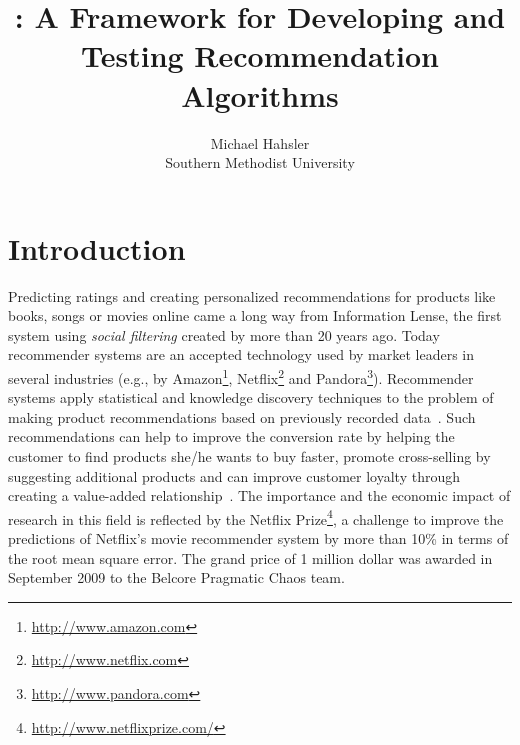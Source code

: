 \documentclass[nojss]{jss}
\author{Michael Hahsler\\Southern Methodist University}
\title{\pkg{recommenderlab}: A Framework for Developing and Testing Recommendation Algorithms}
\begin{document}




\section{Introduction}
Predicting ratings and creating personalized recommendations for products like
books, songs or movies online came a long way from 
Information Lense,
the first system using
\emph{social filtering} created by \cite{recommender:Malone:1987} more than 20
years ago.  Today recommender systems are an accepted technology used by market
leaders in several industries (e.g., by 
Amazon\footnote{\url{http://www.amazon.com}}, 
Netflix\footnote{\url{http://www.netflix.com}} and 
Pandora\footnote{\url{http://www.pandora.com}}).  
Recommender
systems apply statistical and knowledge discovery techniques to the problem of
making product recommendations based on previously recorded 
data~\citep{recommender:Sarwar:2000}.  Such
recommendations can help to improve the conversion rate by helping
the customer to find
products she/he wants to buy faster, promote cross-selling by suggesting
additional products and can improve customer loyalty through creating a
value-added relationship~\citep{recommender:Schafer:2001}.  The importance and
the economic impact of research in this field is reflected by the Netflix 
Prize\footnote{\url{http://www.netflixprize.com/}}, a challenge to improve 
the predictions of Netflix's movie recommender system by more than 
10\% in terms
of the root mean square error. The grand price of 1 million dollar was
awarded in September 2009 to the Belcore Pragmatic Chaos team.
\end{document}
